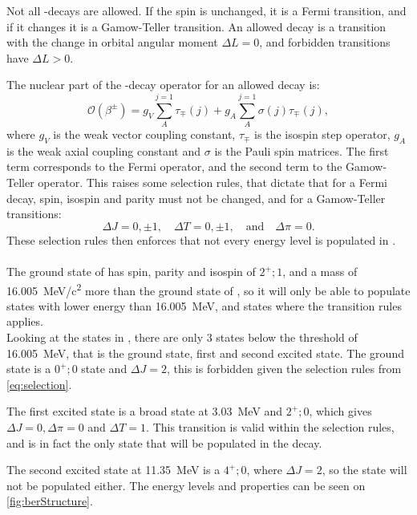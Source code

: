 Not all \be-decays are allowed. If the spin is unchanged, it is a Fermi transition, and if it changes it is a Gamow-Teller transition. 
An allowed decay is a transition with the change in orbital angular moment $\Delta L = 0$, and forbidden transitions have $\Delta L > 0$.

The nuclear part of the \be-decay operator for an allowed decay is:
\begin{equation}
	\mathcal{O} (\beta^\pm) = g_V \sum_{A}^{j=1}\tau_\mp (j) + g_A \sum_{A}^{j=1}\sigma(j)\tau_\mp(j),
\end{equation}
where $g_V$ is the weak vector coupling constant, $\tau_\mp$ is the isospin step operator, $g_A$ is the weak axial coupling constant and $\sigma$ is the Pauli spin matrices.
The first term corresponds to the Fermi operator, and the second term to the Gamow-Teller operator. 
This raises some selection rules, that dictate that for a Fermi decay, spin, isospin and parity must not be changed, and for a Gamow-Teller transitions:
\begin{equation}
\Delta J = 0, \pm1,\quad \Delta T = 0, \pm 1,\quad \text{and}\quad \Delta \pi = 0.
\label{eq:selection}
\end{equation}
These selection rules \cite{doi:https://doi.org/10.1002/9783527693610.ch24} then enforces that not every energy level is populated in \ber. 
\\
\\
The ground state of \li has spin, parity and isospin of $2^+; 1$, and a mass of \SI{16.005}{MeV/c^2} more than the ground state of \ber, so it will only be able to populate states with lower energy than \SI{16.005}{MeV}, and states where the transition rules applies.\\
Looking at the states in \ber, there are only 3 states below the threshold of \SI{16.005}{MeV}, that is the ground state, first and second excited state. 
The ground state is a $0^+; 0$ state and $\Delta J = 2$, this is forbidden given the selection rules from \cref{eq:selection}. 

The first excited state is a broad state at \SI{3.03}{MeV} and $2^+; 0$, which gives $\Delta J = 0, \Delta \pi = 0$ and $\Delta T = 1$. This transition is valid within the selection rules, and is in fact the only state that will be populated in the decay.

The second excited state at \SI{11.35}{MeV} is a  $4^+; 0$, where $\Delta J = 2$, so the state will not be populated either.
The energy levels and properties can be seen on \cref{fig:berStructure}.
